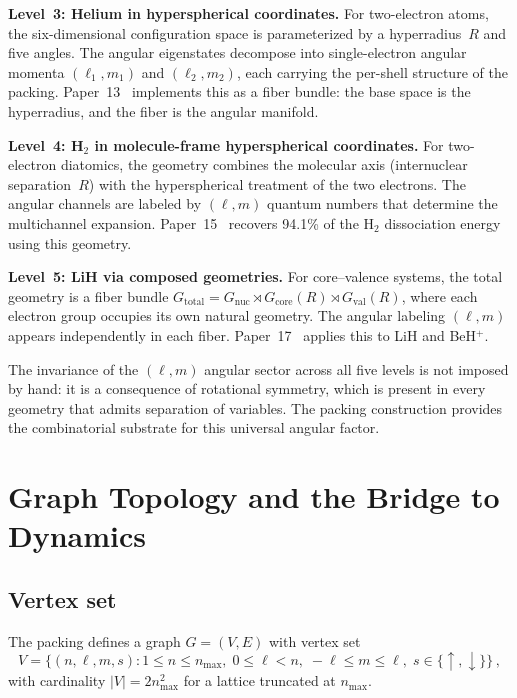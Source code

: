 \documentclass[aps,prl,reprint,amsmath,amssymb]{revtex4-2}
\begin{document}
\textbf{Level~3: Helium in hyperspherical coordinates.}
For two-electron atoms, the six-dimensional configuration space is
parameterized by a hyperradius~$R$ and five angles.  The angular
eigenstates decompose into single-electron angular momenta
$(\ell_1, m_1)$ and $(\ell_2, m_2)$, each carrying the per-shell
structure of the packing.  Paper~13~\cite{paper13} implements this as
a fiber bundle: the base space is the hyperradius, and the fiber is
the angular manifold.

\textbf{Level~4: H$_2$ in molecule-frame hyperspherical coordinates.}
For two-electron diatomics, the geometry combines the molecular axis
(internuclear separation~$R$) with the hyperspherical treatment of the
two electrons.  The angular channels are labeled by $(\ell, m)$
quantum numbers that determine the multichannel expansion.
Paper~15~\cite{paper15} recovers 94.1\% of the H$_2$ dissociation
energy using this geometry.

\textbf{Level~5: LiH via composed geometries.}
For core--valence systems, the total geometry is a fiber bundle
$G_{\mathrm{total}} = G_{\mathrm{nuc}} \rtimes G_{\mathrm{core}}(R)
\rtimes G_{\mathrm{val}}(R)$, where each electron group occupies its
own natural geometry.  The angular labeling $(\ell, m)$ appears
independently in each fiber.  Paper~17~\cite{paper17} applies this to
LiH and BeH$^+$.

\medskip

The invariance of the $(\ell, m)$ angular sector across all five
levels is not imposed by hand: it is a consequence of rotational
symmetry, which is present in every geometry that admits separation of
variables.  The packing construction provides the combinatorial
substrate for this universal angular factor.


\section{Graph Topology and the Bridge to Dynamics}
\label{sec:graph}

\subsection{Vertex set}

The packing defines a graph $G = (V, E)$ with vertex set
\begin{equation}
  V = \bigl\{(n, \ell, m, s) : 1 \leq n \leq n_{\max},\;
      0 \leq \ell < n,\;
      -\ell \leq m \leq \ell,\;
      s \in \{\uparrow, \downarrow\}\bigr\} \,,
  \label{eq:vertex-set}
\end{equation}
with cardinality $|V| = 2n_{\max}^2$ for a lattice truncated at
$n_{\max}$.
\end{document}
